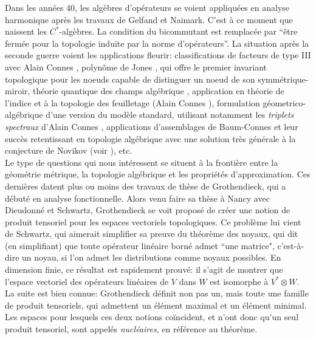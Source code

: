 \documentclass[a4paper,11pt]{article}
\begin{document}
Dans les ann\'ees 40, les alg\`ebres d'op\'erateurs se voient appliqu\'ees en analyse harmonique apr\`es les travaux de Gelfand et Naimark. C'est \`a ce moment que naissent les $C^*$-alg\`ebres. La condition du bicommutant est remplac\'ee par ``\^etre ferm\'ee pour la topologie induite par la norme d'op\'erateurs''. La situation apr\`es la seconde guerre voient les applications fleurir: classifications de facteurs de type III avec Alain Connes \cite{connes1976classification}, polyn\^ome de Jones \cite{jones1990hecke}, qui offre le premier invariant topologique pour les noeuds capable de distinguer un noeud de son symm\'etrique-miroir, th\'eorie quantique des champs alg\'ebrique \cite{haag1964algebraic}, application en th\'eorie de l'indice et \`a la topologie des feuilletage (Alain Connes \cite{connesfoliations}), formulation g\'eometrico-alg\'ebrique d'une version du mod\`ele standard, utilisant notamment les \textit{triplets spectraux} d'Alain Connes \cite{chamseddine1996universal}, applications d'assemblages de Baum-Connes \cite{BaumConnesHigson} et leur succ\`es retentissant en topologie alg\'ebrique avec une solution tr\`es g\'en\'erale \`a la conjecture de Novikov (voir \cite{HigsonKasparov}), etc. \\

Le type de questions qui nous int\'eressent se situent \`a la fronti\`ere entre la g\'eom\'etrie m\'etrique, la topologie alg\'ebrique et les propri\'et\'es d'approximation. Ces derni\`eres datent plus ou moins des travaux de th\`ese de Grothendieck, qui a d\'ebut\'e en analyse fonctionnelle. Alors venu faire sa th\`ese \`a Nancy avec Dieudonn\'e et Schwartz, Grothendieck se voit propos\'e de cr\'eer une notion de produit tensoriel pour les espaces vectoriels topologiques. Ce probl\`eme lui vient de Schwartz, qui aimerait simplifier sa preuve du th\'eor\`eme des noyaux, qui dit (en simplifiant) que toute op\'erateur lin\'eaire born\'e admet ``une matrice", c'est-\`a-dire un noyau, si l'on admet les distributions comme noyaux possibles. En dimension finie, ce r\'esultat est rapidement prouv\'e: il s'agit de montrer que l'espace vectoriel des op\'erateurs lin\'eaires de $V$ dans $W$ est isomorphe \`a $V^* \otimes W$. La suite est bien connue: Grothendieck d\'efinit non pas un, mais toute une famille de produit tensoriels, qui admettent un \'el\'ement maximal et un \'el\'ement minimal. Les espaces pour lesquels ces deux notions co\"incident, et n'ont donc qu'un seul produit tensoriel, sont appel\'es \textit{nucl\'eaires}, en r\'ef\'erence au th\'eor\`eme.\\
\end{document}
